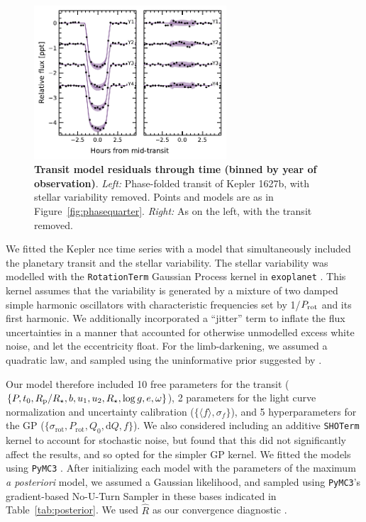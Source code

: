 \documentclass[12pt,modern,twocolumn,tighten]{aastex63}
\begin{document}
\begin{figure}[t]
	\begin{center}
		\leavevmode
		\includegraphics[width=0.64\textwidth]{f10.pdf}
	\end{center}
	\vspace{-0.7cm}
	\caption{
    {\bf Transit model residuals through time (binned by year of observation)}.  
    {\it Left:}
    Phase-folded transit of Kepler 1627b, with stellar variability
    removed.  Points and models are as
    in Figure~\ref{fig:phasequarter}.
    {\it Right:}
    As on the left, with the transit removed.
		\label{fig:phaseyear}
	}
\end{figure}

We fitted the Kepler nce time series with a model that
simultaneously included the planetary transit and the stellar
variability.  The stellar variability was modelled with the
\texttt{RotationTerm} Gaussian Process kernel in \texttt{exoplanet}
\citep{exoplanet:exoplanet}.  This kernel assumes that the variability
is generated by a mixture of two damped simple harmonic oscillators
with characteristic frequencies set by 1/$P_{\rm rot}$ and its first
harmonic.  We additionally incorporated a ``jitter'' term to inflate
the flux uncertainties in a manner that accounted for otherwise
unmodelled excess white noise, and let the eccentricity float.  For
the limb-darkening, we assumed a quadratic law, and sampled using the
uninformative prior suggested by \citet{exoplanet:kipping13}.

Our model therefore included 10 free parameters for the
transit ($\{P, t_0, R_{\rm p}/R_\star, b, u_1 ,u_2 ,R_\star, \log g,
e, \omega \}$), 2 parameters for the light curve
normalization and uncertainty calibration ($\{\langle f \rangle, 
\sigma_f \}$), and 5 hyperparameters for the GP
($\{\sigma_{\mathrm{rot}}, P_{\mathrm{rot}}, Q_0,
\mathrm{d}Q, f \}$).  We also considered including an additive
\texttt{SHOTerm} kernel to account for stochastic noise, but found
that this did not significantly affect the results, and so opted for
the simpler GP kernel.  We fitted the models using \texttt{PyMC3}
\citep{salvatier_2016_PyMC3,exoplanet:theano}.  After initializing
each model with the parameters of the maximum {\it a posteriori}
model, we assumed a Gaussian likelihood, and sampled using
\texttt{PyMC3}'s gradient-based No-U-Turn Sampler
\citep{hoffman_no-u-turn_2014} in these bases indicated in Table~\ref{tab:posterior}.
We used $\hat{R}$ as our convergence
diagnostic \citep{gelman_inference_1992}.
\end{document}
